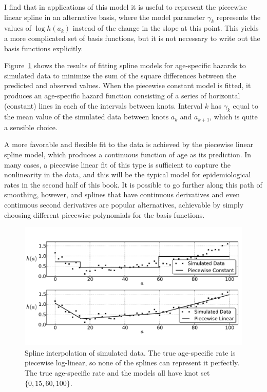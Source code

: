 I find that in applications of this model it is useful to represent
the piecewise linear spline in an alternative basis, where the model
parameter $\gamma_k$ represents the values of $\log h(a_k)$ instead of the
change in the slope at this point.  This yields a more complicated set
of basis functions, but it is not necessary to write out the basis
functions explicitly.


Figure~\ref{splines_fig} shows the results of fitting spline models
for age-specific hazards to simulated data to minimize the sum of the
square differences between the predicted and observed values.  When
the piecewise constant model is fitted, it produces an age-specific
hazard function consisting of a series of horizontal (constant) lines
in each of the intervals between knots.  Interval $k$ has
$\gamma_k$ equal to the mean value of the simulated data between knots
$a_k$ and $a_{k+1}$, which is quite a sensible choice.

A more favorable and flexible fit to the data is achieved by the
piecewise linear spline model, which produces a continuous function
of age as its prediction. In many cases, a piecewise linear fit of
this type is sufficient to capture the nonlinearity in the data, and
this will be the typical model for epidemiological rates in the second
half of this book.  It is possible to go further along this path of
smoothing, however, and splines that have continuous derivatives and
even continuous second derivatives are popular alternatives, achievable
by simply choosing different piecewise polynomials for the basis
functions.


\begin{figure}[h]
\begin{center}
\includegraphics[width=\textwidth]{splines-fig.pdf}
\caption[Spline interpolation of simulated data.]{Spline interpolation
  of simulated data. The true age-specific
  rate is piecewise log-linear, so none of the splines can represent
  it perfectly. The true age-specific rate and the models all have
  knot set $\{0, 15, 60, 100\}$.}
\label{splines_fig}
\end{center}
\end{figure}


